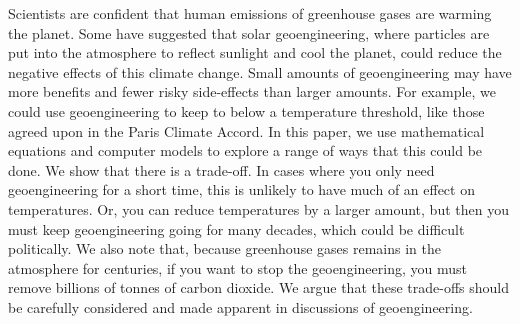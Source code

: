\documentclass[draft]{agujournal2019}
\begin{document}
Scientists are confident that human emissions of greenhouse gases are warming the planet. Some have suggested that solar geoengineering, where particles are put into the atmosphere to reflect sunlight and cool the planet, could reduce the negative effects of this climate change. Small amounts of geoengineering may have more benefits and fewer risky side-effects than larger amounts. For example, we could use geoengineering to keep to below a temperature threshold, like those agreed upon in the Paris Climate Accord. In this paper, we use mathematical equations and computer models to explore a range of ways that this could be done. We show that there is a trade-off. In cases where you only need geoengineering for a short time, this is unlikely to have much of an effect on temperatures. Or, you can reduce temperatures by a larger amount, but then you must keep geoengineering going for many decades, which could be difficult politically. We also note that, because greenhouse gases remains in the atmosphere for centuries, if you want to stop the geoengineering, you must remove billions of tonnes of carbon dioxide. We argue that these trade-offs should be carefully considered and made apparent in discussions of geoengineering.







%
%

%

\end{document}
